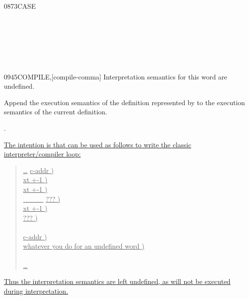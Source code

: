 \begin{worddef}{0873}{CASE}
\begin{testing}
		 \\
		 \\
		 \\
		 \\
		 \\
	\end{testing}
\end{worddef}


\begin{worddef}{0945}{COMPILE,}[compile-comma]
\interpret
	Interpretation semantics for this word are undefined.

\execute

	Append the execution semantics of the definition represented
	by  to the execution semantics of the current
	definition.

\see {}.

	\begin{rationale} %
\cbstart{}
\uline{%
	The intention is that  can be used as follows to write
	the classic interpreter/com\-piler loop:}

	\begin{quote}\ttfamily
	\uline{\ldots} 									\tab[22]		\uline{ c-addr )} \\
	\uline{  }		\tab[17.2]	\uline{ xt +-1 )} \\
	\tab \uline{  }		\tab[17.4]	\uline{ xt +-1 )} \\
		\tab[2] \uline{  \ 
			 \ 
		 \ 
			 \ 
		}								\tab[0.2]		\uline{ ??? )} \\
	\tab \uline{}							\tab[21]		\uline{ xt +-1 )} \\
		\tab[2] \uline{ } 	\tab[14.6]	\uline{ ??? )} \\
	\tab \uline{} \\
		\uline{\word{ELSE}} 							\tab[22]		\uline{ c-addr )} \\
	\tab \uline{\word{p} \textrm{whatever you do for an undefined word} )} \\
	\uline{\word{THEN}} \\
	\uline{\ldots}
	\end{quote}

\uline{%
	Thus the interpretation semantics are left undefined, as 
	will not be executed during interpretation.}


\end{rationale}
\end{worddef}

